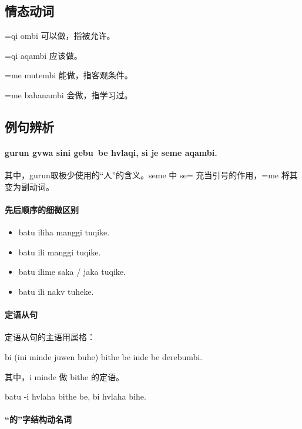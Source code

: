 \subsection{情态动词}

\begin{des}
    \item[\V =qi ombi] 可以做\V ，指被允许。
    \item[\V =qi aqambi] 应该做\V 。
    \item[\V =me mutembi] 能做\V ，指客观条件。
    \item[\V =me bahanambi] 会做\V ，指学习过。
\end{des}


\subsection{例句辨析}

\paragraph{gurun gvwa sini gebu~be hvlaqi, si je seme  aqambi.} 其中，gurun取极少使用的“人”的含义。seme 中 se= 充当引号的作用，=me 将其变为副动词。

\paragraph{先后顺序的细微区别}

\begin{itemize}
    \item batu iliha manggi tuqike.
    \item batu ili manggi tuqike.
    \item batu ilime saka / jaka tuqike.
    \item batu ili nakv tuheke.
\end{itemize}

\paragraph{定语从句} 定语从句的主语用属格：

bi (ini minde juwen buhe) bithe be inde be derebumbi.

其中，i minde   做 bithe 的定语。

batu -i hvlaha bithe be, bi  hvlaha bihe.

\paragraph{“的”字结构动名词}

